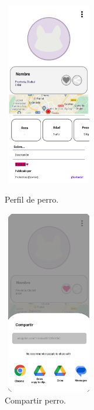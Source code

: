 \documentclass[a4paper, 12pt]{article}
\begin{document}
\begin{figure}[H]
   	\begin{minipage}{0.48\textwidth}
		\begin{center}
			{\includegraphics[height=8cm, width=4cm]{design/DogProfile.jpg}\par}
			\caption{Perfil de perro.}
			\medskip
		\end{center}  
	\end{minipage}\hfill
   	\begin{minipage}{0.48\textwidth}
		\begin{center}
			{\includegraphics[height=8cm, width=4cm]{design/ShareAction.jpg}\par}
			\caption{Compartir perro.}
			\medskip
		\end{center}  
	\end{minipage}\hfill
\end{figure}
\end{document}
